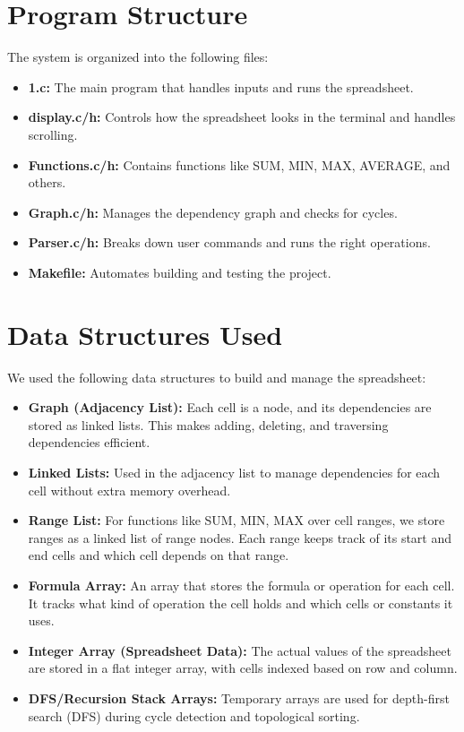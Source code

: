 \documentclass{article}
\begin{document}
\section{Program Structure}
The system is organized into the following files:
\begin{itemize}
    \item \textbf{1.c:} The main program that handles inputs and runs the spreadsheet.
    \item \textbf{display.c/h:} Controls how the spreadsheet looks in the terminal and handles scrolling.
    \item \textbf{Functions.c/h:} Contains functions like SUM, MIN, MAX, AVERAGE, and others.
    \item \textbf{Graph.c/h:} Manages the dependency graph and checks for cycles.
    \item \textbf{Parser.c/h:} Breaks down user commands and runs the right operations.
    \item \textbf{Makefile:} Automates building and testing the project.
\end{itemize}
\section{Data Structures Used}
We used the following data structures to build and manage the spreadsheet:

\begin{itemize}
    \item \textbf{Graph (Adjacency List):} 
    Each cell is a node, and its dependencies are stored as linked lists. This makes adding, deleting, and traversing dependencies efficient.
    
    \item \textbf{Linked Lists:} 
    Used in the adjacency list to manage dependencies for each cell without extra memory overhead.

    \item \textbf{Range List:} 
    For functions like SUM, MIN, MAX over cell ranges, we store ranges as a linked list of range nodes. Each range keeps track of its start and end cells and which cell depends on that range.

    \item \textbf{Formula Array:} 
    An array that stores the formula or operation for each cell. It tracks what kind of operation the cell holds and which cells or constants it uses.

    \item \textbf{Integer Array (Spreadsheet Data):} 
    The actual values of the spreadsheet are stored in a flat integer array, with cells indexed based on row and column.

    \item \textbf{DFS/Recursion Stack Arrays:} 
    Temporary arrays are used for depth-first search (DFS) during cycle detection and topological sorting.
\end{itemize}
\end{document}
